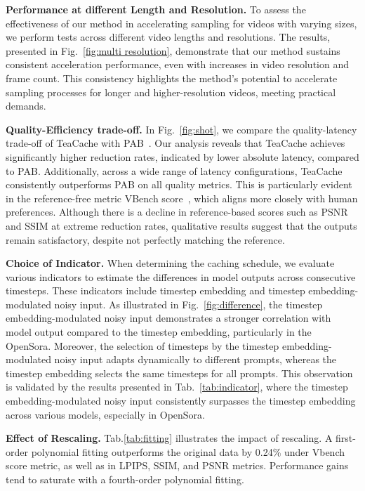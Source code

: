 \textbf{Performance at different Length and Resolution.} To assess the effectiveness of our method in accelerating sampling for videos with varying sizes, we perform tests across different video lengths and resolutions. The results, presented in Fig.~\ref{fig:multi resolution}, demonstrate that our method sustains consistent acceleration performance, even with increases in video resolution and frame count. This consistency highlights the method's potential to accelerate sampling processes for longer and higher-resolution videos, meeting practical demands.

\textbf{Quality-Efficiency trade-off.} In Fig.~\ref{fig:shot}, we compare the quality-latency trade-off of TeaCache with PAB~\cite{zhao2024real}. Our analysis reveals that TeaCache achieves significantly higher reduction rates, indicated by lower absolute latency, compared to PAB. Additionally, across a wide range of latency configurations, TeaCache consistently outperforms PAB on all quality metrics. This is particularly evident in the reference-free metric VBench score~\cite{huang2024vbench}, which aligns more closely with human preferences. Although there is a decline in reference-based scores such as PSNR and SSIM at extreme reduction rates, qualitative results suggest that the outputs remain satisfactory, despite not perfectly matching the reference.

\textbf{Choice of Indicator.} When determining the caching schedule, we evaluate various indicators to estimate the differences in model outputs across consecutive timesteps. These indicators include timestep embedding and timestep embedding-modulated noisy input. As illustrated in Fig.~\ref{fig:difference}, the timestep embedding-modulated noisy input demonstrates a stronger correlation with model output compared to the timestep embedding, particularly in the OpenSora. Moreover, the selection of timesteps by the timestep embedding-modulated noisy input adapts dynamically to different prompts, whereas the timestep embedding selects the same timesteps for all prompts. This observation is validated by the results presented in Tab.~\ref{tab:indicator}, where the timestep embedding-modulated noisy input consistently surpasses the timestep embedding across various models, especially in OpenSora.

\textbf{Effect of Rescaling.} Tab.\ref{tab:fitting} illustrates the impact of rescaling. A first-order polynomial fitting outperforms the original data by 0.24\% under Vbench score metric, as well as in LPIPS, SSIM, and PSNR metrics. Performance gains tend to saturate with a fourth-order polynomial fitting.




